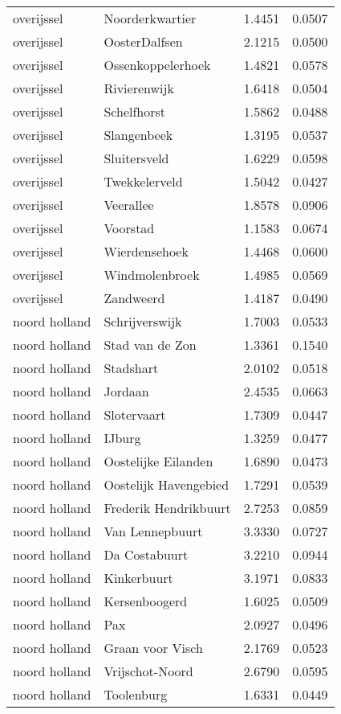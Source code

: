 \begin{longtable}{llcc}
overijssel & Noorderkwartier & 1.4451 & 0.0507 \\
overijssel & OosterDalfsen & 2.1215 & 0.0500 \\
overijssel & Ossenkoppelerhoek & 1.4821 & 0.0578 \\
overijssel & Rivierenwijk & 1.6418 & 0.0504 \\
overijssel & Schelfhorst & 1.5862 & 0.0488 \\
overijssel & Slangenbeek & 1.3195 & 0.0537 \\
overijssel & Sluitersveld & 1.6229 & 0.0598 \\
overijssel & Twekkelerveld & 1.5042 & 0.0427 \\
overijssel & Veerallee & 1.8578 & 0.0906 \\
overijssel & Voorstad & 1.1583 & 0.0674 \\
overijssel & Wierdensehoek & 1.4468 & 0.0600 \\
overijssel & Windmolenbroek & 1.4985 & 0.0569 \\
overijssel & Zandweerd & 1.4187 & 0.0490 \\
noord holland & Schrijverswijk & 1.7003 & 0.0533 \\
noord holland & Stad van de Zon & 1.3361 & 0.1540 \\
noord holland & Stadshart & 2.0102 & 0.0518 \\
noord holland & Jordaan & 2.4535 & 0.0663 \\
noord holland & Slotervaart & 1.7309 & 0.0447 \\
noord holland & IJburg & 1.3259 & 0.0477 \\
noord holland & Oostelijke Eilanden & 1.6890 & 0.0473 \\
noord holland & Oostelijk Havengebied & 1.7291 & 0.0539 \\
noord holland & Frederik Hendrikbuurt & 2.7253 & 0.0859 \\
noord holland & Van Lennepbuurt & 3.3330 & 0.0727 \\
noord holland & Da Costabuurt & 3.2210 & 0.0944 \\
noord holland & Kinkerbuurt & 3.1971 & 0.0833 \\
noord holland & Kersenboogerd & 1.6025 & 0.0509 \\
noord holland & Pax & 2.0927 & 0.0496 \\
noord holland & Graan voor Visch & 2.1769 & 0.0523 \\
noord holland & Vrijschot-Noord & 2.6790 & 0.0595 \\
noord holland & Toolenburg & 1.6331 & 0.0449 \\

\end{longtable}
